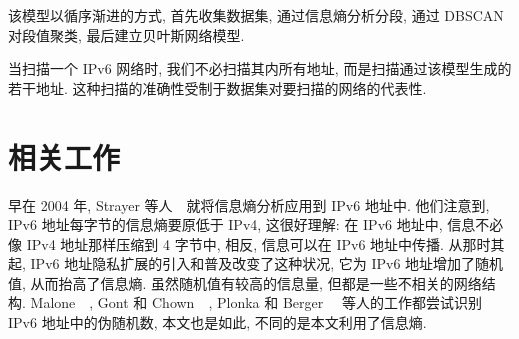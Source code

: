 该模型以循序渐进的方式, 首先收集数据集, 通过信息熵分析分段, 通过 DBSCAN 对段值聚类, 最后建立贝叶斯网络模型.

当扫描一个 IPv6 网络时, 我们不必扫描其内所有地址, 而是扫描通过该模型生成的若干地址. 这种扫描的准确性受制于数据集对要扫描的网络的代表性.

\section{相关工作}

早在 2004 年, Strayer 等人~\cite{ref:strayer}~就将信息熵分析应用到 IPv6 地址中. 他们注意到, IPv6 地址每字节的信息熵要原低于 IPv4, 这很好理解: 在 IPv6 地址中, 信息不必像 IPv4 地址那样压缩到 4 字节中, 相反, 信息可以在 IPv6 地址中传播. 从那时其起, IPv6 地址隐私扩展的引入和普及改变了这种状况, 它为 IPv6 地址增加了随机值, 从而抬高了信息熵. 虽然随机值有较高的信息量, 但都是一些不相关的网络结构. Malone~\cite{ref:malone}~, Gont 和 Chown~\cite{ref:gont}~, Plonka 和 Berger~\cite{ref:plonka}~ 等人的工作都尝试识别 IPv6 地址中的伪随机数, 本文也是如此, 不同的是本文利用了信息熵.